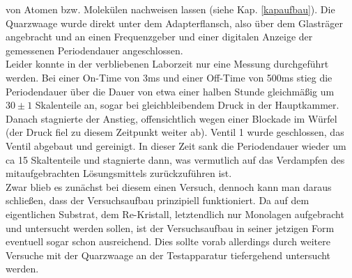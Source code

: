 von Atomen bzw. Molekülen nachweisen lassen (siehe Kap. \ref{kapaufbau}). Die Quarzwaage wurde
direkt unter dem Adapterflansch, also über dem Glasträger angebracht und an einen Frequenzgeber und einer
digitalen Anzeige der gemessenen Periodendauer angeschlossen.\\
Leider konnte in der verbliebenen Laborzeit nur eine Messung durchgeführt werden. Bei einer
On-Time von 3ms und einer Off-Time von 500ms stieg die Periodendauer über die Dauer von etwa einer
halben Stunde gleichmäßig um $30\pm1$ Skalenteile an, sogar bei gleichbleibendem Druck in der
Hauptkammer. Danach stagnierte der Anstieg, offensichtlich wegen einer Blockade im Würfel (der
Druck fiel zu diesem Zeitpunkt weiter ab). Ventil 1 wurde geschlossen, das Ventil abgebaut und
gereinigt. In dieser Zeit sank die Periodendauer wieder um ca 15 Skaltenteile und stagnierte dann,
was vermutlich auf das Verdampfen des mitaufgebrachten Lösungsmittels zurückzuführen ist.\\
Zwar blieb es zunächst bei diesem einen Versuch, dennoch kann man daraus schließen, dass der
Versuchsaufbau prinzipiell funktioniert. Da auf dem eigentlichen Substrat, dem Re-Kristall,
letztendlich nur Monolagen aufgebracht und untersucht werden sollen, ist der
Versuchsaufbau in seiner jetzigen Form eventuell sogar schon ausreichend. Dies sollte vorab
allerdings durch weitere Versuche mit der Quarzwaage an der Testapparatur tiefergehend untersucht
werden.



























